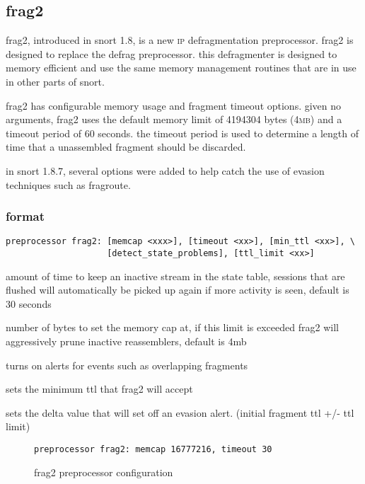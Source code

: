 \documentclass[english]{report}
\begin{document}
\subsection{frag2\label{frag2 section}}

frag2, introduced in snort 1.8, is a new \textsc{ip} defragmentation
preprocessor. frag2 is designed to replace the defrag preprocessor.
this defragmenter is designed to memory efficient and use the same
memory management routines that are in use in other parts of snort. 

frag2 has configurable memory usage and fragment timeout options.
given no arguments, frag2 uses the default memory limit of 4194304
bytes (4\textsc{mb}) and a timeout period of 60 seconds. the timeout
period is used to determine a length of time that a unassembled fragment
should be discarded.

in snort 1.8.7, several options were added to help catch the use of
evasion techniques such as fragroute. 


\subsubsection{format}

\begin{verbatim}
preprocessor frag2: [memcap <xxx>], [timeout <xx>], [min_ttl <xx>], \
                    [detect_state_problems], [ttl_limit <xx>] 
\end{verbatim}
\begin{description}{}
\item [timeout~<seconds>]amount of time to keep an inactive stream in
the state table, sessions that are flushed will automatically be picked
up again if more activity is seen, default is 30 seconds
\item [memcap~<bytes>]number of bytes to set the memory cap at, if this
limit is exceeded frag2 will aggressively prune inactive reassemblers,
default is 4mb
\item [detect\_state\_problems] turns on alerts for events such as overlapping
fragments
\item [min\_ttl] sets the minimum ttl that frag2 will accept
\item [ttl\_limit] sets the delta value that will set off an evasion alert.
(initial fragment ttl +/- ttl limit) 
\end{description}
%
\begin{figure}[!hbpt]
\begin{verbatim}
preprocessor frag2: memcap 16777216, timeout 30
\end{verbatim}

\caption{frag2 preprocessor configuration \label{frag2 example}}
\end{figure}
\end{document}
